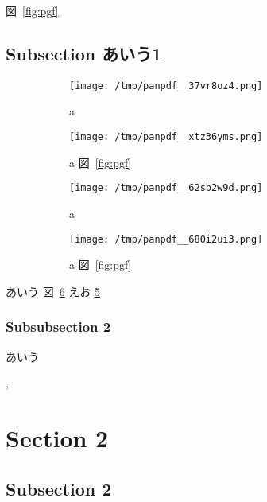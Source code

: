 \documentclass[
  a4paper,
  jafontscale=0.92,
  hanging_punctuation,
  head_space=24.8mm,
  foot_space=24.8mm]{jlreq}
\begin{document}
図~\ref{fig:pgf}

\subsection{Subsection あいう1}\label{subsection-ux3042ux3044ux30461}

\begin{figure}
\centering
\begin{subfigure}{0.475\columnwidth}
\centering
\texttt{[image: /tmp/panpdf\_\_37vr8oz4.png]}
\caption{a}\label{fig:png}
\end{subfigure}
\begin{subfigure}{0.475\columnwidth}
\centering
\texttt{[image: /tmp/panpdf\_\_xtz36yms.png]}
\caption{a 図~\ref{fig:pgf}}\label{fig:png}
\end{subfigure}
\caption{}\label{fig:xxx}
\end{figure}

\begin{figure}
\centering
\begin{subfigure}{0.475\columnwidth}
\centering
\texttt{[image: /tmp/panpdf\_\_62sb2w9d.png]}
\caption{a}\label{fig:png}
\end{subfigure}
\begin{subfigure}{0.475\columnwidth}
\centering
\texttt{[image: /tmp/panpdf\_\_680i2ui3.png]}
\caption{a 図~\ref{fig:pgf}}\label{fig:png}
\end{subfigure}
\caption{}\label{fig:xxx}
\end{figure}

あいう 図~\ref{fig:xxx}
えお \ref{fig:png}

\subsubsection{Subsubsection 2}\label{subsubsection-2}

あいう

, 

\section{Section 2}\label{sec:2}

\subsection{Subsection 2}\label{subsection-2}
\end{document}
